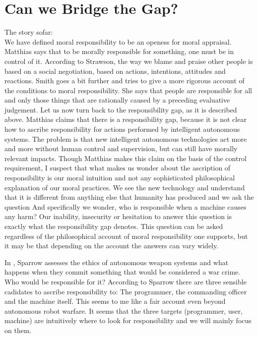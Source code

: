 \documentclass{article}
\begin{document}
\section{Can we Bridge the Gap?}

The story sofar:\\
We have defined moral responsibility to be an openess for moral appraisal.
Matthias says that to be morally responsible for something, one must be in
control of it. According to Strawson, the way we blame and praise other people
is based on a social negotiation, based on actions, intentions, attitudes and
reactions. Smith goes a bit further and tries to give a more rigorous account of
the conditions to moral responsibility. She says that people are responsible for
all and only those things that are rationally caused by a preceding evaluative
judgement. Let us now turn back to the responsibility gap, as it is described
above. Matthias claims that there is a responsibility gap, because it is not
clear how to ascribe responsibility for actions performed by intelligent
autonomous systems. The problem is that new intelligent autonomous technologies
act more and more without human control and supervision, but can still have
morally relevant impacts. Though Matthias makes this claim on the basis of the
control requirement, I suspect that what makes us wonder about the
ascription of responsibility is our moral intuition and not any sophisticated
philosophical explanation of our moral practices. We see the new technology and
understand that it is different from anything else that humanity has produced
and we ask the question  And specifically we
wonder, who is responsible when a machine causes any harm?
Our inability, insecurity or hesitation to answer this question is exactly what
the responsibility gap denotes.
This question can be asked regardless of the philosophical account of moral
responsibility one supports, but it may be that depending on the account the
answers can vary widely.

In , Sparrow assesses the ethics of
autonomous weapon systems and what happens when they commit something that would
be considered a war crime. Who would be responsible for it? According to Sparrow
there are three sensible cadidates to ascribe responsibility to: The programmer,
the commanding officer and the machine itself. This seems to me like a fair
account even beyond autonomous robot warfare. It seems that the three targets
(programmer, user, machine) are intuitively where to look for responsibility and
we will mainly focus on them.
\end{document}
